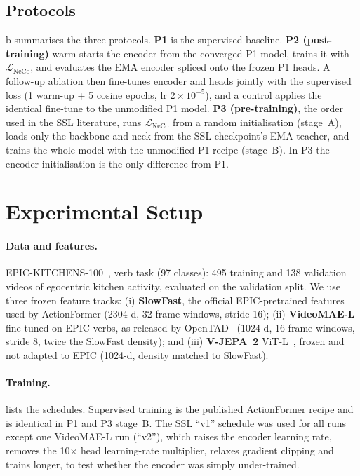 \documentclass[10pt,a4paper]{article}
\begin{document}
\subsection{Protocols}
b summarises the three protocols. \textbf{P1} is the supervised
baseline. \textbf{P2 (post-training)} warm-starts the encoder from the converged P1
model, trains it with $\mathcal{L}_{\text{NeCo}}$, and evaluates the EMA encoder spliced
onto the frozen P1 heads. A follow-up ablation then fine-tunes encoder and heads jointly
with the supervised loss (1 warm-up + 5 cosine epochs, lr $2{\times}10^{-5}$), and a control
applies the identical fine-tune to the unmodified P1 model. \textbf{P3 (pre-training)},
the order used in the SSL literature, runs $\mathcal{L}_{\text{NeCo}}$ from a random
initialisation (stage~A), loads only the backbone and neck from the SSL checkpoint's EMA
teacher, and trains the whole model with the unmodified P1 recipe (stage~B). In P3 the
encoder initialisation is the only difference from P1.

\section{Experimental Setup}\label{sec:setup}

\paragraph{Data and features.} EPIC-KITCHENS-100~\cite{damen2022epic}, verb task
(97 classes): 495 training and 138 validation videos of egocentric kitchen activity,
evaluated on the validation split. We use three frozen feature tracks: (i)
\textbf{SlowFast}, the official EPIC-pretrained features used by
ActionFormer (2304-d, 32-frame windows, stride 16); (ii) \textbf{VideoMAE-L} fine-tuned on
EPIC verbs, as released by OpenTAD~\cite{liu2025opentad} (1024-d, 16-frame windows, stride
8, twice the SlowFast density); and (iii) \textbf{V-JEPA~2} ViT-L~\cite{assran2025vjepa2},
frozen and not adapted to EPIC (1024-d, density matched to SlowFast).

\paragraph{Training.}  lists the schedules. Supervised training is the
published ActionFormer recipe and is identical in P1 and P3 stage~B. The SSL ``v1''
schedule was used for all runs except one VideoMAE-L run (``v2''), which raises the encoder
learning rate, removes the 10$\times$ head learning-rate multiplier, relaxes gradient
clipping and trains longer, to test whether the encoder was simply under-trained.
\end{document}
